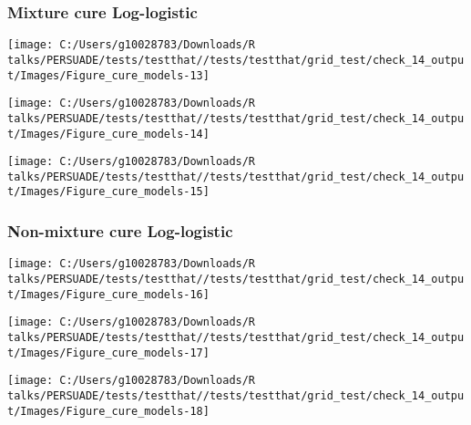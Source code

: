 \documentclass[
]{article}
\begin{document}
\clearpage

\subsubsection{Mixture cure
Log-logistic}\label{mixture-cure-log-logistic}

\begin{flushleft}\texttt{[image: C:/Users/g10028783/Downloads/R talks/PERSUADE/tests/testthat//tests/testthat/grid\_test/check\_14\_output/Images/Figure\_cure\_models-13]} \end{flushleft}

\begin{flushleft}\texttt{[image: C:/Users/g10028783/Downloads/R talks/PERSUADE/tests/testthat//tests/testthat/grid\_test/check\_14\_output/Images/Figure\_cure\_models-14]} \end{flushleft}

\begin{flushleft}\texttt{[image: C:/Users/g10028783/Downloads/R talks/PERSUADE/tests/testthat//tests/testthat/grid\_test/check\_14\_output/Images/Figure\_cure\_models-15]} \end{flushleft}

\clearpage

\subsubsection{Non-mixture cure
Log-logistic}\label{non-mixture-cure-log-logistic}

\begin{flushleft}\texttt{[image: C:/Users/g10028783/Downloads/R talks/PERSUADE/tests/testthat//tests/testthat/grid\_test/check\_14\_output/Images/Figure\_cure\_models-16]} \end{flushleft}

\begin{flushleft}\texttt{[image: C:/Users/g10028783/Downloads/R talks/PERSUADE/tests/testthat//tests/testthat/grid\_test/check\_14\_output/Images/Figure\_cure\_models-17]} \end{flushleft}

\begin{flushleft}\texttt{[image: C:/Users/g10028783/Downloads/R talks/PERSUADE/tests/testthat//tests/testthat/grid\_test/check\_14\_output/Images/Figure\_cure\_models-18]} \end{flushleft}
\end{document}

